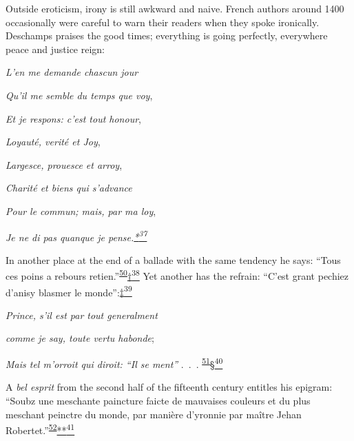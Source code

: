 Outside eroticism, irony is still awkward and naive. French authors
around 1400 occasionally were careful to warn their readers when they
spoke ironically. Deschamps praises the good times; everything is going
perfectly, everywhere peace and justice reign:

\emph{L'en me demande chascun jour}

\emph{Qu'il me semble du temps que voy},

\emph{Et je respons: c'est tout honour},

\emph{Loyauté, verité et Joy},

\emph{Largesce, prouesce et arroy},

\emph{Charité et biens qui s'advance}

\emph{Pour le commun; mais, par ma loy},

\emph{Je ne di pas quanque je
pense.\protect\hypertarget{21_Chapter_Thirteen__IMAGE_AND_WORD.xhtmlux5cux23id_2367}{\protect\hyperlink{23_NOTES.xhtmlux5cux23id_2368}{*\textsuperscript{37}}}}

In another place at the end of a ballade with the same tendency he says:
``Tous ces poins a rebours
retien.''\textsuperscript{\protect\hypertarget{21_Chapter_Thirteen__IMAGE_AND_WORD.xhtmlux5cux23id_212}{\protect\hyperlink{23_NOTES.xhtmlux5cux23id_213}{50}}}\protect\hypertarget{21_Chapter_Thirteen__IMAGE_AND_WORD.xhtmlux5cux23id_2369}{\protect\hyperlink{23_NOTES.xhtmlux5cux23id_2370}{†\textsuperscript{38}}}
Yet another has the refrain: ``C'est grant pechiez d'anisy blasmer le
monde'':\protect\hypertarget{21_Chapter_Thirteen__IMAGE_AND_WORD.xhtmlux5cux23id_2371}{\protect\hyperlink{23_NOTES.xhtmlux5cux23id_2372}{‡\textsuperscript{39}}}

\emph{Prince, s'il est par tout generalment}

\emph{comme je say, toute vertu habonde};

\emph{Mais tel m'orroit qui diroit: ``Il se ment''} .~.~.
\textsuperscript{\protect\hypertarget{21_Chapter_Thirteen__IMAGE_AND_WORD.xhtmlux5cux23id_210}{\protect\hyperlink{23_NOTES.xhtmlux5cux23id_211}{51}}}\protect\hypertarget{21_Chapter_Thirteen__IMAGE_AND_WORD.xhtmlux5cux23id_2373}{\protect\hyperlink{23_NOTES.xhtmlux5cux23id_2374}{§\textsuperscript{40}}}

A \emph{bel esprit} from the second half of the fifteenth century
entitles his epigram: ``Soubz une meschante paincture faicte de
mauvaises couleurs et du plus meschant peinctre du monde, par manière
d'yronnie par maître Jehan
Robertet.''\textsuperscript{\protect\hypertarget{21_Chapter_Thirteen__IMAGE_AND_WORD.xhtmlux5cux23id_208}{\protect\hyperlink{23_NOTES.xhtmlux5cux23id_209}{52}}}\protect\hypertarget{21_Chapter_Thirteen__IMAGE_AND_WORD.xhtmlux5cux23id_2375}{\protect\hyperlink{23_NOTES.xhtmlux5cux23id_2376}{**\textsuperscript{41}}}

